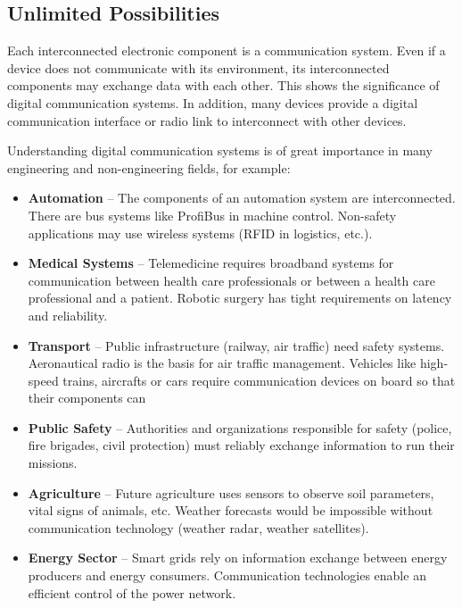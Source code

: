 \begin{refsection}
\section*{Unlimited Possibilities}

Each interconnected electronic component is a communication system. Even if a device does not communicate with its environment, its interconnected components may exchange data with each other. This shows the significance of digital communication systems. In addition, many devices provide a digital communication interface or radio link to interconnect with other devices.

Understanding digital communication systems is of great importance in many engineering and non-engineering fields, for example:
\begin{itemize}
	\item \textbf{Automation} -- The components of an automation system are interconnected. There are bus systems like ProfiBus in machine control. Non-safety applications may use wireless systems (RFID in logistics, etc.).
	\item \textbf{Medical Systems} -- Telemedicine requires broadband systems for communication between health care professionals or between a health care professional and a patient. Robotic surgery has tight requirements on latency and reliability.
	\item \textbf{Transport} -- Public infrastructure (railway, air traffic) need safety systems. Aeronautical radio is the basis for air traffic management. Vehicles like high-speed trains, aircrafts or cars require communication devices on board so that their components can 
	\item \textbf{Public Safety} -- Authorities and organizations responsible for safety (police, fire brigades, civil protection) must reliably exchange information to run their missions.
	\item \textbf{Agriculture} -- Future agriculture uses sensors to observe soil parameters, vital signs of animals, etc. Weather forecasts would be impossible without communication technology (weather radar, weather satellites).
	\item \textbf{Energy Sector} -- Smart grids rely on information exchange between energy producers and energy consumers. Communication technologies enable an efficient control of the power network.
\end{itemize}

{}
\printbibliography[heading=subbibliography]
\end{refsection}
